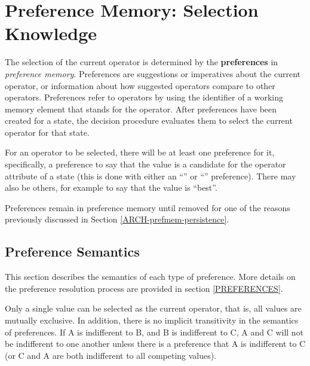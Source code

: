 \section{Preference Memory: Selection Knowledge}
\label{ARCH-prefmem}

The selection of the current operator is determined by the \textbf{preferences} in \emph{preference memory}. Preferences are suggestions or imperatives about the current operator, or information about how suggested operators compare to other operators.  Preferences refer to operators by using the identifier of a working memory element that stands for the operator. After preferences have been created for a state, the decision procedure evaluates them to select the current operator for that state.

For an operator to be selected, there will be at least one preference for it, specifically, a preference to say that the value is a candidate for the operator attribute of a state (this is done with either an ``'' or ``'' preference). There may also be others, for example to say that the value is ``best''.

Preferences remain in preference memory until removed for one of the reasons previously discussed in Section \ref{ARCH-prefmem-persistence}.

\subsection{Preference Semantics}
\label{ARCH-prefmem-semantics}

This section describes the semantics of each type of preference.  More details on the preference resolution process are provided in section \ref{PREFERENCES}.


Only a single value can be selected as the current operator, that is, all values are mutually exclusive.  In addition, there is no implicit transitivity in the semantics of preferences.  If A is indifferent to B, and B is indifferent to C, A and C will not be indifferent to one another unless there is a preference that A is indifferent to C (or C and A are both indifferent to all competing values).

